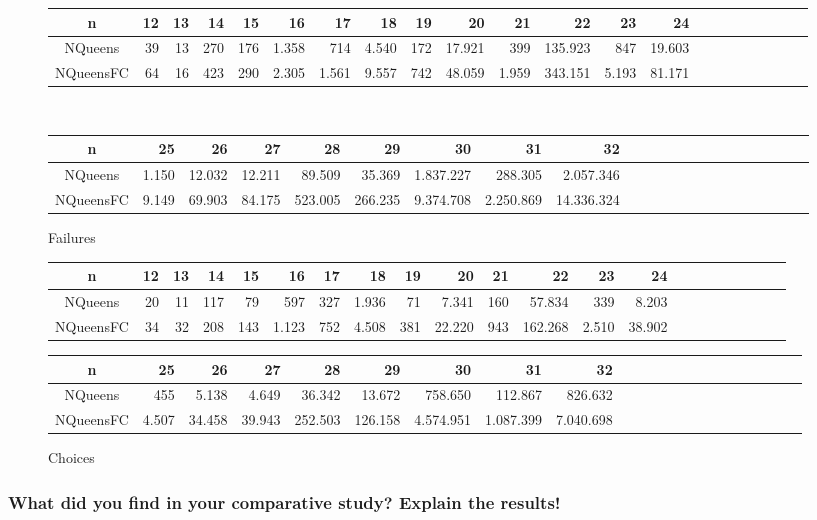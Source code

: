 \documentclass[a4paper ,12pt,french]{article}
\begin{document}
\begin{figure}[!h]\hspace{-1.2cm}
\begin{tabular}{|c||r|r|r|r|r|r|r|r|r|r|r|r|r|r|r|r|r|r|r|r|r|}
\hline
n&12&13&14&15&16&17&18&19&20&21&22 &23&24  \\
\hline\hline
NQueens &39&13&270&176&1.358&714&4.540&172&17.921&399&135.923&847&19.603    \\
\hline
NQueensFC &64&16&423&290&2.305&1.561&9.557&742&48.059&1.959&343.151& 5.193 &81.171    \\
\hline
\end{tabular}
\\
\begin{tabular}{|c||r|r|r|r|r|r|r|r|r|r|r|r|r|r|r|r|r|r|r|r|r|}
\hline
n&25&26&27&28&29&30&31&32   \\
\hline\hline
NQueens &1.150&12.032&12.211&89.509&35.369&1.837.227&288.305&2.057.346    \\
\hline
NQueensFC &9.149&69.903& 84.175&523.005&266.235& 9.374.708&2.250.869&14.336.324 \\
\hline
\end{tabular}
\caption{Failures}
\end{figure}
\begin{figure}[!h]\hspace{-1cm}
\begin{tabular}{|c||r|r|r|r|r|r|r|r|r|r|r|r|r|r|r|r|r|r|r|r|r|}
\hline
n&12&13&14&15&16&17&18&19&20&21&22 &23&24  \\
\hline\hline
NQueens &20&11&117&79&597&327&1.936&71&7.341&160&57.834 &339 &8.203   \\
\hline
NQueensFC &34&32&208&143&1.123&752&4.508&381&22.220&943& 162.268 &2.510 &38.902\\
\hline
\end{tabular}
\begin{tabular}{|c||r|r|r|r|r|r|r|r|r|r|r|r|r|r|r|r|r|r|r|r|r|}
\hline
n&25&26&27&28&29&30&31&32   \\
\hline\hline
NQueens &455&5.138&4.649&36.342&13.672&758.650&112.867&826.632     \\
\hline
NQueensFC &4.507&34.458&39.943&252.503&126.158&4.574.951&1.087.399&7.040.698  \\
\hline
\end{tabular}
\caption{Choices}
\end{figure}



\subsubsection{What did you find in your comparative study? Explain the results!}
\end{document}
